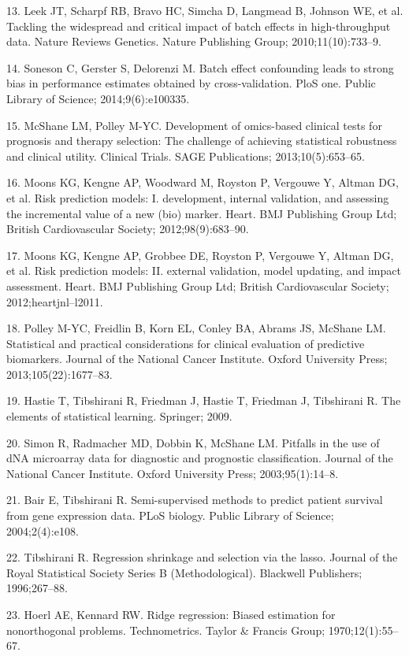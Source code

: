 \documentclass[11pt]{article}
\begin{document}
13. Leek JT, Scharpf RB, Bravo HC, Simcha D, Langmead B, Johnson WE, et
al. Tackling the widespread and critical impact of batch effects in
high-throughput data. Nature Reviews Genetics. Nature Publishing Group;
2010;11(10):733--9.

14. Soneson C, Gerster S, Delorenzi M. Batch effect confounding leads to
strong bias in performance estimates obtained by cross-validation. PloS
one. Public Library of Science; 2014;9(6):e100335.

15. McShane LM, Polley M-YC. Development of omics-based clinical tests
for prognosis and therapy selection: The challenge of achieving
statistical robustness and clinical utility. Clinical Trials. SAGE
Publications; 2013;10(5):653--65.

16. Moons KG, Kengne AP, Woodward M, Royston P, Vergouwe Y, Altman DG,
et al. Risk prediction models: I. development, internal validation, and
assessing the incremental value of a new (bio) marker. Heart. BMJ
Publishing Group Ltd; British Cardiovascular Society;
2012;98(9):683--90.

17. Moons KG, Kengne AP, Grobbee DE, Royston P, Vergouwe Y, Altman DG,
et al. Risk prediction models: II. external validation, model updating,
and impact assessment. Heart. BMJ Publishing Group Ltd; British
Cardiovascular Society; 2012;heartjnl--l2011.

18. Polley M-YC, Freidlin B, Korn EL, Conley BA, Abrams JS, McShane LM.
Statistical and practical considerations for clinical evaluation of
predictive biomarkers. Journal of the National Cancer Institute. Oxford
University Press; 2013;105(22):1677--83.

19. Hastie T, Tibshirani R, Friedman J, Hastie T, Friedman J, Tibshirani
R. The elements of statistical learning. Springer; 2009.

20. Simon R, Radmacher MD, Dobbin K, McShane LM. Pitfalls in the use of
dNA microarray data for diagnostic and prognostic classification.
Journal of the National Cancer Institute. Oxford University Press;
2003;95(1):14--8.

21. Bair E, Tibshirani R. Semi-supervised methods to predict patient
survival from gene expression data. PLoS biology. Public Library of
Science; 2004;2(4):e108.

22. Tibshirani R. Regression shrinkage and selection via the lasso.
Journal of the Royal Statistical Society Series B (Methodological).
Blackwell Publishers; 1996;267--88.

23. Hoerl AE, Kennard RW. Ridge regression: Biased estimation for
nonorthogonal problems. Technometrics. Taylor \& Francis Group;
1970;12(1):55--67.
\end{document}
